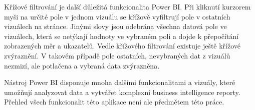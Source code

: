 Křížové filtrování je další důležitá funkcionalita Power BI. Při kliknutí kurzorem myši na určité pole v jednom vizuálu se křížově vyfiltrují pole v ostatních vizuálech na stránce. Jinými slovy jsou odebrána všechna datová pole ve vizuálech, která se netýkají hodnoty ve vybraném poli a dojde k přepočítání zobrazených měr a ukazatelů. Vedle křížového filtrování existuje ještě křížové zvýraznění. V takovém případě pole ostatních, nevybraných dat z vizuálů nezmizí, ale potlačena a vybraná data zvýrazněna. 

Nástroj Power BI disponuje mnoha dalšími funkcionalitami a vizuály, které umožňují analyzovat data a  vytvářet komplexní business intelligence reporty. Přehled všech funkcionalit této aplikace není ale předmětem této práce.











